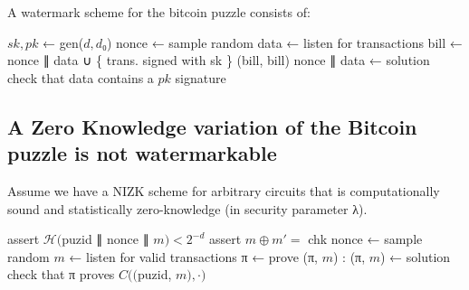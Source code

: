 \documentclass{article}
\newcommand{\hash}{\mathcal{H}}
\begin{document}
A watermark scheme for the bitcoin puzzle consists of:

\begin{algorithmic}[0]
  \State
  \State $sk,pk$ ← gen($d,d₀$)
  \State
    \State nonce ← sample random
    \State data ← listen for transactions
    \State bill ← nonce ∥ data ∪ \{ trans. signed with sk \}
    \State \Return (bill, bill)
  \EndFunction
  \State
    \State \Return {$\hash($puzid$ || $bill$) < 2^{-d₀}$}
  \EndFunction
  \State
     \State nonce ∥ data ← solution
     \State check that data contains a $pk$ signature
  \EndFunction
\end{algorithmic}

\subsection{A Zero Knowledge variation of the Bitcoin puzzle is not watermarkable}

Assume we have a NIZK scheme for arbitrary circuits that is computationally sound and statistically zero-knowledge (in security parameter λ).

\begin{algorithmic}[0]
 \State
   \State assert $\hash($puzid ∥ nonce ∥ $m) < 2^{-d}$
   \State assert $m ⊕ m' =$ chk
 \EndFunction
 \State
   \State nonce ← sample random
   \State $m$ ← listen for valid transactions
   \State π ← prove 
   \State \Return (π, $m$)
 \EndFunction
 \State
 :
    \State (π, $m$) ← solution
    \State check that π proves $C(($puzid, $m), \cdot)$
 \EndFunction
\end{algorithmic}
\end{document}
